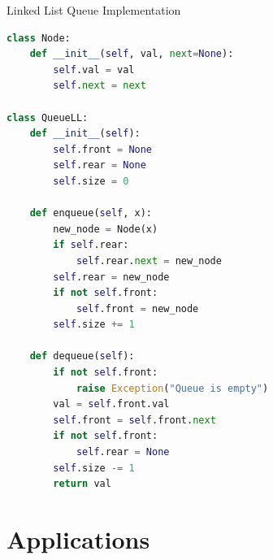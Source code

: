 \documentclass[aspectratio=169,xcolor=dvipsnames]{beamer}
\begin{document}
\begin{frame}[fragile]{Linked List Queue Implementation}
  \begin{lstlisting}[language=Python,basicstyle=\small\ttfamily]
class Node:
    def __init__(self, val, next=None):
        self.val = val
        self.next = next

class QueueLL:
    def __init__(self):
        self.front = None
        self.rear = None
        self.size = 0

    def enqueue(self, x):
        new_node = Node(x)
        if self.rear:
            self.rear.next = new_node
        self.rear = new_node
        if not self.front:
            self.front = new_node
        self.size += 1

    def dequeue(self):
        if not self.front:
            raise Exception("Queue is empty")
        val = self.front.val
        self.front = self.front.next
        if not self.front:
            self.rear = None
        self.size -= 1
        return val
  \end{lstlisting}
\end{frame}

\section{Applications}
\end{document}
